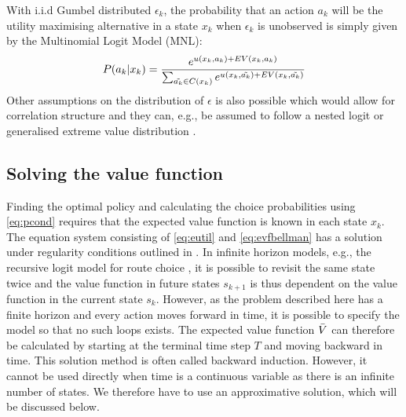 With i.i.d Gumbel distributed $\epsilon_k$, the probability that an action $a_k$ will be the utility maximising alternative in a state $x_k$ when $\epsilon_{k}$ is unobserved is simply given by the Multinomial Logit Model (MNL): 
\newcommand{\akt}{\tilde{a_k}}
\begin{equation} \label{eq:pcond}
P(a_k|x_k) = \frac{e^{\avgu(x_k,a_k) + \eutil(x_k,a_k)}}{\sum_{\akt \in C(x_k)}e^{\avgu(x_k,\akt) + \eutil(x_k,\akt)}}
\end{equation} 
Other assumptions on the distribution of $\epsilon$ is also possible which would allow for correlation structure and they can, e.g., be assumed to follow a nested logit or generalised extreme value distribution \citep[as illustrated for the recursive logit specification by][]{mai2015,mai2016method}.


\subsection{Solving the value function}
Finding the optimal policy and calculating the choice probabilities using \eqref{eq:pcond} requires that the expected value function is known in each state $x_k$. The equation system consisting of \eqref{eq:eutil} and \eqref{eq:evfbellman} has a solution under regularity conditions outlined in \citet{RustML88}. In infinite horizon models, e.g., the recursive logit model for route choice \citep{fosgerau2013}, it is possible to revisit the same state twice and the value function in future states $s_{k+1}$ is thus dependent on the value function in the current state $s_k$. However, as the problem described here has a finite horizon and every action moves forward in time, it is possible to specify the model so that no such loops exists. The expected value function $\bar{V}$ can therefore be calculated by starting at the terminal time step $T$ and moving backward in time. This solution method is often called backward induction. However, it cannot be used directly when time is a continuous variable as there is an infinite number of states. We therefore have to use an approximative solution, which will be discussed below.

